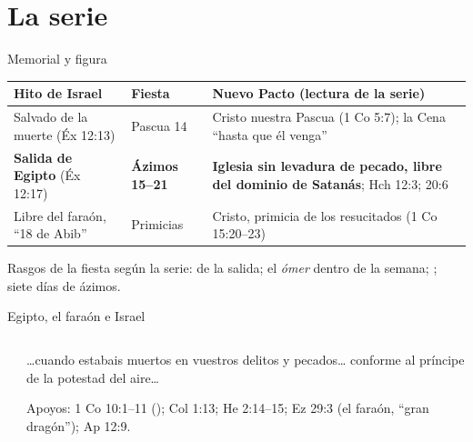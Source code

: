 \section{La serie}

\begin{frame}{Memorial y figura}
\scriptsize\renewcommand{\arraystretch}{1.18}
\begin{tabular}{@{}L{3.4cm}L{2.0cm}L{6.6cm}@{}}
\toprule
\textbf{Hito de Israel} & \textbf{Fiesta} & \textbf{Nuevo Pacto (lectura de la serie)} \\ \midrule
Salvado de la muerte (Éx 12:13) & Pascua 14 & Cristo nuestra Pascua (1 Co 5:7); la Cena ``hasta que él venga'' \\
\textbf{Salida de Egipto} (Éx 12:17) & \textbf{Ázimos 15--21} & \textbf{Iglesia sin levadura de pecado, libre del dominio de Satanás}; Hch 12:3; 20:6 \\
Libre del faraón, ``18 de Abib'' & Primicias & Cristo, primicia de los resucitados (1 Co 15:20--23) \\
\bottomrule
\end{tabular}\par\medskip
\small Rasgos de la fiesta según la serie:  de la salida; el \emph{ómer} dentro de la semana; ; siete días de ázimos.
\end{frame}

\begin{frame}{Egipto, el faraón e Israel}
\begin{columns}[t,onlytextwidth]
\begin{column}{0.50\textwidth}
\centering
{}
\end{column}
\begin{column}{0.48\textwidth}
\begin{cita}\ldots{}cuando estabais muertos en vuestros delitos y pecados\ldots{} conforme al príncipe de la potestad del aire\ldots{}\end{cita}
\scriptsize Apoyos: 1 Co 10:1--11 (); Col 1:13; He 2:14--15; Ez 29:3 (el faraón, ``gran dragón''); Ap 12:9.\par
{}
\end{column}
\end{columns}
\end{frame}

